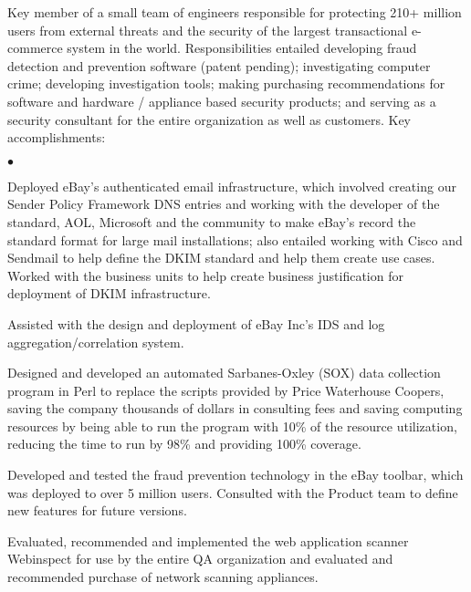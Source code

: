 \documentclass[11pt]{article}
\begin{document}
{\small
\noindent
Key member of a small team of engineers responsible for protecting 210+ million users from external threats and the security of the largest transactional e-commerce system in the world.  Responsibilities entailed developing fraud detection and prevention software (patent pending); investigating computer crime; developing investigation tools; making purchasing recommendations for software and hardware / appliance based security products; and serving as a security consultant for the entire organization as well as customers.  Key accomplishments:

\begin{list}{$\bullet$}{
}
\item Deployed eBay's authenticated email infrastructure, which involved creating our Sender Policy Framework DNS entries and working with the developer of the standard, AOL, Microsoft and the community to make eBay's record the standard format for large mail installations; also entailed working with Cisco and Sendmail to help define the DKIM standard and help them create use cases.  Worked with the business units to help create business justification for deployment of DKIM infrastructure.
\item Assisted with the design and deployment of eBay Inc's IDS and log aggregation/correlation system.
\item Designed and developed an automated Sarbanes-Oxley (SOX) data collection program in Perl to replace the scripts provided by Price Waterhouse Coopers, saving the company thousands of dollars in consulting fees and saving computing resources by being able to run the program with 10\% of the resource utilization, reducing the time to run by 98\% and providing 100\% coverage.
\item Developed and tested the fraud prevention technology in the eBay toolbar, which was deployed to over 5 million users.  Consulted with the Product team to define new features for future versions.
\item Evaluated, recommended and implemented the web application scanner Webinspect for use by the entire QA organization and evaluated and recommended purchase of network scanning appliances.
\end{list}
}
\end{document}
